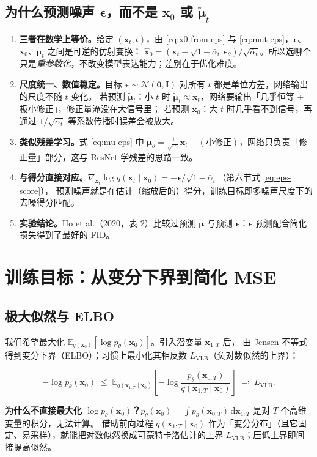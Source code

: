 \documentclass[a4paper,fontset=none,zihao=5]{ctexart}
\numberwithin{equation}{section}
\newcommand{\x}{\mathbf{x}}
\newcommand{\I}{\mathbf{I}}
\newcommand{\N}{\mathcal{N}}
\newcommand{\abar}{\bar{\alpha}}
\newcommand{\eps}{\boldsymbol{\epsilon}}
\newcommand{\epst}{\boldsymbol{\epsilon}_\theta}
\newcommand{\mut}{\tilde{\boldsymbol{\mu}}}
\newcommand{\mutheta}{\boldsymbol{\mu}_\theta}
\newcommand{\E}{\mathbb{E}}
\newcommand{\LVLB}{L_{\mathrm{VLB}}}
\begin{document}
\subsection{为什么预测噪声 \texorpdfstring{$\eps$}{eps}，而不是 \texorpdfstring{$\x_0$}{x\_0} 或 \texorpdfstring{$\mut_t$}{mu}}
\begin{whybox}
\begin{enumerate}[leftmargin=1.5em,itemsep=2pt]
  \item \textbf{三者在数学上等价。}给定 $(\x_t,t)$，由 \eqref{eq:x0-from-eps} 与 \eqref{eq:mut-eps}，$\eps$、$\x_0$、$\mut_t$ 之间是可逆的仿射变换：
        $\hat{\x}_0=(\x_t-\sqrt{1-\abar_t}\,\epst)/\sqrt{\abar_t}$。所以选哪个只是\emph{重参数化}，不改变模型表达能力；差别在于优化难度。
  \item \textbf{尺度统一、数值稳定。}目标 $\eps\sim\N(\mathbf{0},\I)$ 对所有 $t$ 都是单位方差，网络输出的尺度不随 $t$ 变化。
        若预测 $\mut_t$：小 $t$ 时 $\mut_t\approx\x_t$，网络要输出「几乎恒等 + 极小修正」，修正量淹没在大信号里；
        若预测 $\x_0$：大 $t$ 时几乎看不到信号，再通过 $1/\sqrt{\abar_t}$ 等系数传播时误差会被放大。
  \item \textbf{类似残差学习。}式 \eqref{eq:mu-eps} 中 $\mutheta=\frac{1}{\sqrt{\alpha_t}}\x_t-(\text{小修正})$，网络只负责「修正量」部分，这与 ResNet 学残差的思路一致。
  \item \textbf{与得分直接对应。}$\nabla_{\x_t}\log q(\x_t\mid\x_0)=-\eps/\sqrt{1-\abar_t}$（第六节式 \eqref{eq:eps-score}），
        预测噪声就是在估计（缩放后的）得分，训练目标即多噪声尺度下的去噪得分匹配。
  \item \textbf{实验结论。}Ho et al.（2020，表 2）比较过预测 $\mut$ 与预测 $\eps$：$\eps$ 预测配合简化损失得到了最好的 FID。
\end{enumerate}
\end{whybox}

\section{训练目标：从变分下界到简化 MSE}

\subsection{极大似然与 ELBO}
我们希望最大化 $\E_{q(\x_0)}[\log p_\theta(\x_0)]$。引入潜变量 $\x_{1:T}$ 后，
由 Jensen 不等式得到变分下界（ELBO）；习惯上最小化其相反数 $\LVLB$（负对数似然的上界）：
\begin{keybox}
\begin{equation}
  -\log p_\theta(\x_0) \;\le\; \E_{q(\x_{1:T}\mid\x_0)}\!\left[-\log\frac{p_\theta(\x_{0:T})}{q(\x_{1:T}\mid\x_0)}\right] \;\eqqcolon\; \LVLB .
  \label{eq:vlb}
\end{equation}
\end{keybox}
\begin{whybox}
\textbf{为什么不直接最大化 $\log p_\theta(\x_0)$？}$p_\theta(\x_0)=\int p_\theta(\x_{0:T})\,\mathrm{d}\x_{1:T}$ 是对 $T$ 个高维变量的积分，无法计算。
借助前向过程 $q(\x_{1:T}\mid\x_0)$ 作为「变分分布」（且它固定、易采样），就能把对数似然换成可蒙特卡洛估计的上界 $\LVLB$；压低上界即间接提高似然。
\end{whybox}
\end{document}

